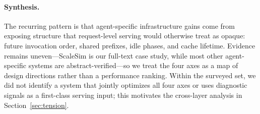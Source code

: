\paragraph*{Synthesis.} The recurring pattern is that agent-specific infrastructure gains come from exposing structure that request-level serving would otherwise treat as opaque: future invocation order, shared prefixes, idle phases, and cache lifetime. Evidence remains uneven---ScaleSim is our full-text case study, while most other agent-specific systems are abstract-verified---so we treat the four axes as a map of design directions rather than a performance ranking. Within the surveyed set, we did not identify a system that jointly optimizes all four axes or uses diagnostic signals as a first-class serving input; this motivates the cross-layer analysis in Section~\ref{sec:tension}.

